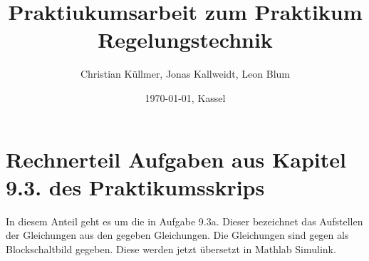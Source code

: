 \documentclass[11pt]{scrartcl}
\begin{document}
\title{Praktiukumsarbeit zum Praktikum Regelungstechnik}
\author{Christian Küllmer, Jonas Kallweidt, Leon Blum}
\date{\today{}, Kassel}
\maketitle
\newpage
\renewcommand{\contentsname}{Inhaltsverzeichnis}
\tableofcontents
\newpage

\section{Rechnerteil Aufgaben aus Kapitel 9.3. des Praktikumsskrips}
In diesem Anteil geht es um die in Aufgabe 9.3a. Dieser bezeichnet das Aufstellen der Gleichungen aus den gegeben Gleichungen. Die Gleichungen sind gegen als Blockschaltbild gegeben. Diese werden jetzt übersetzt in Mathlab Simulink.
\end{document}
